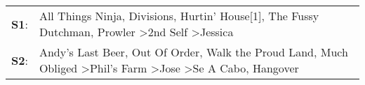 \begin{supertabular}{p{0.03\textwidth}p{0.92\textwidth}}
 \textbf{S1}:  &                                                     All Things Ninja\textsuperscript{}, \enspace Divisions\textsuperscript{}, \enspace Hurtin' House[1]\textsuperscript{}, \enspace The Fussy Dutchman\textsuperscript{}, \enspace Prowler\textsuperscript{} \textgreater \enspace 2nd Self\textsuperscript{} \textgreater \enspace Jessica\textsuperscript{}  \enspace  \\
 \textbf{S2}:  &  Andy's Last Beer\textsuperscript{}, \enspace Out Of Order\textsuperscript{}, \enspace Walk the Proud Land\textsuperscript{}, \enspace Much Obliged\textsuperscript{} \textgreater \enspace Phil's Farm\textsuperscript{} \textgreater \enspace Jose\textsuperscript{} \textgreater \enspace Se A Cabo\textsuperscript{}, \enspace Hangover\textsuperscript{}  \enspace  \\
\end{supertabular}
